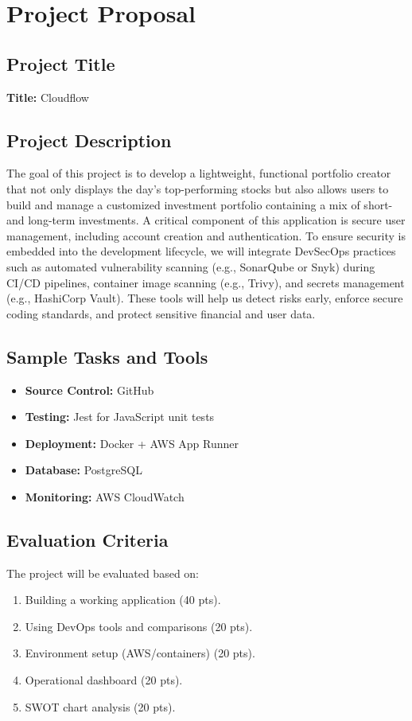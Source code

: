 \chapter{Project Proposal}
\label{ch:proposal}

\section{Project Title}
\textbf{Title:} Cloudflow

\section{Project Description}
The goal of this project is to develop a lightweight, functional portfolio creator that not only displays the day’s top-performing stocks but also allows users to build and manage a customized investment portfolio containing a mix of short- and long-term investments. A critical component of this application is secure user management, including account creation and authentication. To
ensure security is embedded into the development lifecycle, we will integrate DevSecOps practices such as automated vulnerability scanning (e.g., SonarQube or Snyk) during CI/CD pipelines, container image scanning (e.g., Trivy), and secrets management (e.g., HashiCorp Vault). These tools will help us detect risks early, enforce secure coding standards, and protect sensitive financial and user data.

\section{Sample Tasks and Tools}
\begin{itemize}
    \item \textbf{Source Control:} GitHub
    \item \textbf{Testing:} Jest for JavaScript unit tests
    \item \textbf{Deployment:} Docker + AWS App Runner
    \item \textbf{Database:} PostgreSQL
    \item \textbf{Monitoring:} AWS CloudWatch
\end{itemize}

\section{Evaluation Criteria}
The project will be evaluated based on:
\begin{enumerate}
    \item Building a working application (40 pts).
    \item Using DevOps tools and comparisons (20 pts).
    \item Environment setup (AWS/containers) (20 pts).
    \item Operational dashboard (20 pts).
    \item SWOT chart analysis (20 pts).
\end{enumerate}